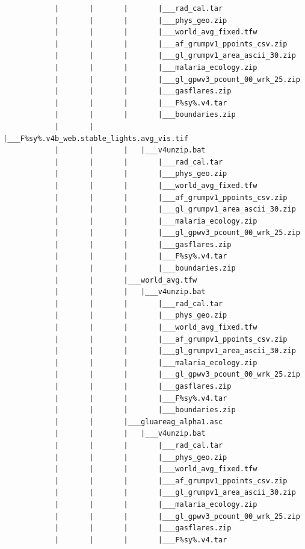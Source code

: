 \documentclass[]{book}
\begin{document}
\begin{verbatim}
            |       |       |       |___rad_cal.tar
            |       |       |       |___phys_geo.zip
            |       |       |       |___world_avg_fixed.tfw
            |       |       |       |___af_grumpv1_ppoints_csv.zip
            |       |       |       |___gl_grumpv1_area_ascii_30.zip
            |       |       |       |___malaria_ecology.zip
            |       |       |       |___gl_gpwv3_pcount_00_wrk_25.zip
            |       |       |       |___gasflares.zip
            |       |       |       |___F%sy%.v4.tar
            |       |       |       |___boundaries.zip
            |       |       |___F%sy%.v4b_web.stable_lights.avg_vis.tif
            |       |       |   |___v4unzip.bat
            |       |       |       |___rad_cal.tar
            |       |       |       |___phys_geo.zip
            |       |       |       |___world_avg_fixed.tfw
            |       |       |       |___af_grumpv1_ppoints_csv.zip
            |       |       |       |___gl_grumpv1_area_ascii_30.zip
            |       |       |       |___malaria_ecology.zip
            |       |       |       |___gl_gpwv3_pcount_00_wrk_25.zip
            |       |       |       |___gasflares.zip
            |       |       |       |___F%sy%.v4.tar
            |       |       |       |___boundaries.zip
            |       |       |___world_avg.tfw
            |       |       |   |___v4unzip.bat
            |       |       |       |___rad_cal.tar
            |       |       |       |___phys_geo.zip
            |       |       |       |___world_avg_fixed.tfw
            |       |       |       |___af_grumpv1_ppoints_csv.zip
            |       |       |       |___gl_grumpv1_area_ascii_30.zip
            |       |       |       |___malaria_ecology.zip
            |       |       |       |___gl_gpwv3_pcount_00_wrk_25.zip
            |       |       |       |___gasflares.zip
            |       |       |       |___F%sy%.v4.tar
            |       |       |       |___boundaries.zip
            |       |       |___gluareag_alpha1.asc
            |       |       |   |___v4unzip.bat
            |       |       |       |___rad_cal.tar
            |       |       |       |___phys_geo.zip
            |       |       |       |___world_avg_fixed.tfw
            |       |       |       |___af_grumpv1_ppoints_csv.zip
            |       |       |       |___gl_grumpv1_area_ascii_30.zip
            |       |       |       |___malaria_ecology.zip
            |       |       |       |___gl_gpwv3_pcount_00_wrk_25.zip
            |       |       |       |___gasflares.zip
            |       |       |       |___F%sy%.v4.tar

\end{verbatim}
\end{document}
